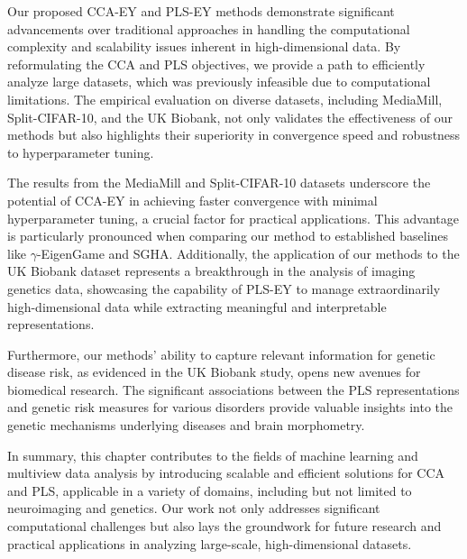 Our proposed CCA-EY and PLS-EY methods demonstrate significant advancements over traditional approaches in handling the computational complexity and scalability issues inherent in high-dimensional data.
By reformulating the CCA and PLS objectives, we provide a path to efficiently analyze large datasets, which was previously infeasible due to computational limitations.
The empirical evaluation on diverse datasets, including MediaMill, Split-CIFAR-10, and the UK Biobank, not only validates the effectiveness of our methods but also highlights their superiority in convergence speed and robustness to hyperparameter tuning.

The results from the MediaMill and Split-CIFAR-10 datasets underscore the potential of CCA-EY in achieving faster convergence with minimal hyperparameter tuning, a crucial factor for practical applications.
This advantage is particularly pronounced when comparing our method to established baselines like $\gamma$-EigenGame and SGHA. Additionally, the application of our methods to the UK Biobank dataset represents a breakthrough in the analysis of imaging genetics data, showcasing the capability of PLS-EY to manage extraordinarily high-dimensional data while extracting meaningful and interpretable representations.

Furthermore, our methods' ability to capture relevant information for genetic disease risk, as evidenced in the UK Biobank study, opens new avenues for biomedical research.
The significant associations between the PLS representations and genetic risk measures for various disorders provide valuable insights into the genetic mechanisms underlying diseases and brain morphometry.

In summary, this chapter contributes to the fields of machine learning and multiview data analysis by introducing scalable and efficient solutions for CCA and PLS, applicable in a variety of domains, including but not limited to neuroimaging and genetics.
Our work not only addresses significant computational challenges but also lays the groundwork for future research and practical applications in analyzing large-scale, high-dimensional datasets.